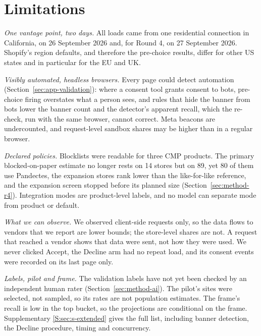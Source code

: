 \section{Limitations}\label{sec:limits}

\emph{One vantage point, two days.} All loads came from one residential connection in California, on 26 September 2026 and, for Round 4, on 27 September 2026. Shopify's region defaults, and therefore the pre-choice results, differ for other US states and in particular for the EU and UK.

\emph{Visibly automated, headless browsers.} Every page could detect automation (Section~\ref{sec:app-validation}): where a consent tool grants consent to bots, pre-choice firing overstates what a person sees, and rules that hide the banner from bots lower the banner count and the detector's apparent recall, which the re-check, run with the same browser, cannot correct. Meta beacons are undercounted, and request-level sandbox shares may be higher than in a regular browser.

\emph{Declared policies.} Blocklists were readable for three CMP products. The primary blocked-on-paper estimate no longer rests on 14 stores but on 89, yet 80 of them use Pandectes, the expansion stores rank lower than the like-for-like reference, and the expansion screen stopped before its planned size (Section~\ref{sec:method-r4}). Integration modes are product-level labels, and no model can separate mode from product or default.

\emph{What we can observe.} We observed client-side requests only, so the data flows to vendors that we report are lower bounds; the store-level shares are not. A request that reached a vendor shows that data were sent, not how they were used. We never clicked Accept, the Decline arm had no repeat load, and its consent events were recorded on its last page only.

\emph{Labels, pilot and frame.} The validation labels have not yet been checked by an independent human rater (Section~\ref{sec:method-ai}). The pilot's sites were selected, not sampled, so its rates are not population estimates. The frame's recall is low in the top bucket, so the projections are conditional on the frame. Supplementary \ref*{S:sec:s-extended} gives the full list, including banner detection, the Decline procedure, timing and concurrency.

